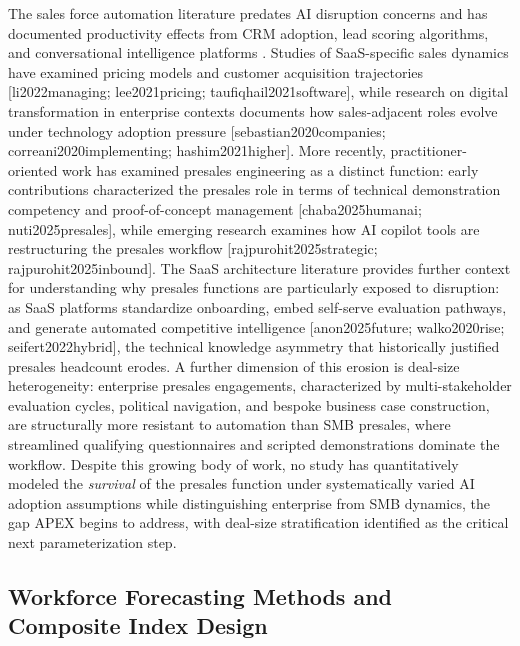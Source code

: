 \documentclass[10pt, conference]{IEEEtran}
\begin{document}
\label{sec:saas_sales_presales_labor_and_the_b2b_te}

The sales force automation literature predates AI disruption concerns and has documented productivity effects from CRM adoption, lead scoring algorithms, and conversational intelligence platforms \cite{groene2024introduction}. Studies of SaaS-specific sales dynamics have examined pricing models and customer acquisition trajectories [li2022managing; lee2021pricing; taufiqhail2021software], while research on digital transformation in enterprise contexts documents how sales-adjacent roles evolve under technology adoption pressure [sebastian2020companies; correani2020implementing; hashim2021higher]. More recently, practitioner-oriented work has examined presales engineering as a distinct function: early contributions characterized the presales role in terms of technical demonstration competency and proof-of-concept management [chaba2025humanai; nuti2025presales], while emerging research examines how AI copilot tools are restructuring the presales workflow [rajpurohit2025strategic; rajpurohit2025inbound]. The SaaS architecture literature provides further context for understanding why presales functions are particularly exposed to disruption: as SaaS platforms standardize onboarding, embed self-serve evaluation pathways, and generate automated competitive intelligence [anon2025future; walko2020rise; seifert2022hybrid], the technical knowledge asymmetry that historically justified presales headcount erodes. A further dimension of this erosion is deal-size heterogeneity: enterprise presales engagements, characterized by multi-stakeholder evaluation cycles, political navigation, and bespoke business case construction, are structurally more resistant to automation than SMB presales, where streamlined qualifying questionnaires and scripted demonstrations dominate the workflow. Despite this growing body of work, no study has quantitatively modeled the \textit{survival} of the presales function under systematically varied AI adoption assumptions while distinguishing enterprise from SMB dynamics, the gap APEX begins to address, with deal-size stratification identified as the critical next parameterization step.

\subsection{Workforce Forecasting Methods and Composite Index Design}

\label{sec:workforce_forecasting_methods_and_compos}
\end{document}
